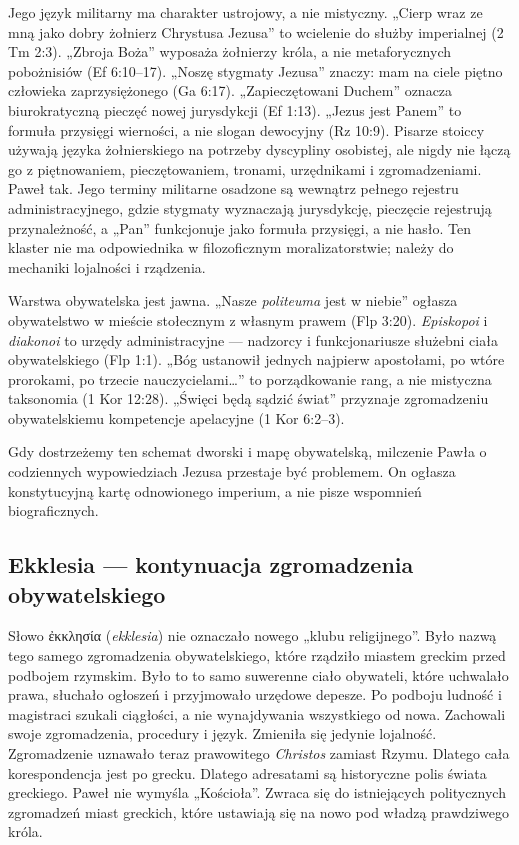 Jego język militarny ma charakter ustrojowy, a nie mistyczny.
„Cierp wraz ze mną jako dobry żołnierz Chrystusa Jezusa” to wcielenie do służby imperialnej (2 Tm 2:3).
„Zbroja Boża” wyposaża żołnierzy króla, a nie metaforycznych pobożnisiów (Ef 6:10–17).
„Noszę stygmaty Jezusa” znaczy: mam na ciele piętno człowieka zaprzysiężonego (Ga 6:17).
„Zapieczętowani Duchem” oznacza biurokratyczną pieczęć nowej jurysdykcji (Ef 1:13).
„Jezus jest Panem” to formuła przysięgi wierności, a nie slogan dewocyjny (Rz 10:9).
Pisarze stoiccy używają języka żołnierskiego na potrzeby dyscypliny osobistej, ale nigdy nie łączą go z piętnowaniem, pieczętowaniem, tronami, urzędnikami i zgromadzeniami.
Paweł tak.
Jego terminy militarne osadzone są wewnątrz pełnego rejestru administracyjnego, gdzie stygmaty wyznaczają jurysdykcję, pieczęcie rejestrują przynależność, a „Pan” funkcjonuje jako formuła przysięgi, a nie hasło.
Ten klaster nie ma odpowiednika w filozoficznym moralizatorstwie; należy do mechaniki lojalności i rządzenia.

Warstwa obywatelska jest jawna.
„Nasze \textit{politeuma} jest w niebie” ogłasza obywatelstwo w mieście stołecznym z własnym prawem (Flp 3:20).
\textit{Episkopoi} i \textit{diakonoi} to urzędy administracyjne — nadzorcy i funkcjonariusze służebni ciała obywatelskiego (Flp 1:1).
„Bóg ustanowił jednych najpierw apostołami, po wtóre prorokami, po trzecie nauczycielami\ldots” to porządkowanie rang, a nie mistyczna taksonomia (1 Kor 12:28).
„Święci będą sądzić świat” przyznaje zgromadzeniu obywatelskiemu kompetencje apelacyjne (1 Kor 6:2–3).

Gdy dostrzeżemy ten schemat dworski i mapę obywatelską, milczenie Pawła o codziennych wypowiedziach Jezusa przestaje być problemem.
On ogłasza konstytucyjną kartę odnowionego imperium, a nie pisze wspomnień biograficznych.

\subsection{Ekklesia — kontynuacja zgromadzenia obywatelskiego}\label{subsec:ekklesia-the-civic-assembly-continued}

Słowo ἐκκλησία (\textit{ekklesia}) nie oznaczało nowego „klubu religijnego”.
Było nazwą tego samego zgromadzenia obywatelskiego, które rządziło miastem greckim przed podbojem rzymskim.
Było to to samo suwerenne ciało obywateli, które uchwalało prawa, słuchało ogłoszeń i przyjmowało urzędowe depesze.
Po podboju ludność i magistraci szukali ciągłości, a nie wynajdywania wszystkiego od nowa.
Zachowali swoje zgromadzenia, procedury i język.
Zmieniła się jedynie lojalność.
Zgromadzenie uznawało teraz prawowitego \textit{Christos} zamiast Rzymu.
Dlatego cała korespondencja jest po grecku.
Dlatego adresatami są historyczne polis świata greckiego.
Paweł nie wymyśla „Kościoła”.
Zwraca się do istniejących politycznych zgromadzeń miast greckich, które ustawiają się na nowo pod władzą prawdziwego króla.

